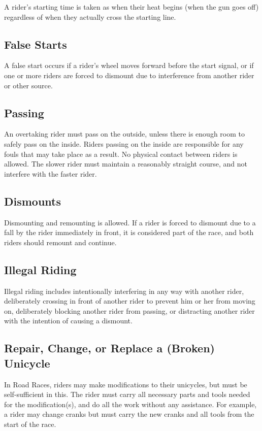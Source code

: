 A rider's starting time is taken as when their heat begins (when the gun goes off) regardless of when they actually cross the starting line.

\subsection{False Starts}

A false start occurs if a rider's wheel moves forward before the start signal, or if one or more riders are forced to dismount due to interference from another rider or other source.

\subsection{Passing}

An overtaking rider must pass on the outside, unless there is enough room to safely pass on the inside.
Riders passing on the inside are responsible for any fouls that may take place as a result.
No physical contact between riders is allowed.
The slower rider must maintain a reasonably straight course, and not interfere with the faster rider.

\subsection{Dismounts}

Dismounting and remounting is allowed.
If a rider is forced to dismount due to a fall by the rider immediately in front, it is considered part of the race, and both riders should remount and continue.

\subsection{Illegal Riding}

Illegal riding includes intentionally interfering in any way with another rider, deliberately crossing in front of another rider to prevent him or her from moving on, deliberately blocking another rider from passing, or distracting another rider with the intention of causing a dismount.

\subsection{Repair, Change, or Replace a (Broken) Unicycle}
In Road Races, riders may make modifications to their unicycles, but must be self-sufficient in this.
The rider must carry all necessary parts and tools needed for the modification(s), and do all the work without any assistance.
For example, a rider may change cranks but must carry the new cranks and all tools from the start of the race.


